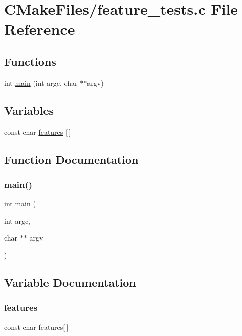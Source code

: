 \hypertarget{cmake-build-debug_2_c_make_files_2feature__tests_8c}{}\section{C\+Make\+Files/feature\+\_\+tests.c File Reference}
\label{cmake-build-debug_2_c_make_files_2feature__tests_8c}
\subsection*{Functions}
\begin{DoxyCompactItemize}
\item 
int \mbox{\hyperlink{cmake-build-debug_2_c_make_files_2feature__tests_8c_a3c04138a5bfe5d72780bb7e82a18e627}{main}} (int argc, char $\ast$$\ast$argv)
\end{DoxyCompactItemize}
\subsection*{Variables}
\begin{DoxyCompactItemize}
\item 
const char \mbox{\hyperlink{cmake-build-debug_2_c_make_files_2feature__tests_8c_a1582568e32f689337602a16bf8a5bff0}{features}} \mbox{[}$\,$\mbox{]}
\end{DoxyCompactItemize}


\subsection{Function Documentation}
\mbox{\label{cmake-build-debug_2_c_make_files_2feature__tests_8c_a3c04138a5bfe5d72780bb7e82a18e627}} 
\subsubsection{\texorpdfstring{main()}{main()}}
{\footnotesize\ttfamily int main (\begin{DoxyParamCaption}\item[{int}]{argc,  }\item[{char $\ast$$\ast$}]{argv }\end{DoxyParamCaption})}



\subsection{Variable Documentation}
\mbox{\label{cmake-build-debug_2_c_make_files_2feature__tests_8c_a1582568e32f689337602a16bf8a5bff0}} 
\subsubsection{\texorpdfstring{features}{features}}
{\footnotesize\ttfamily const char features\mbox{[}$\,$\mbox{]}}

